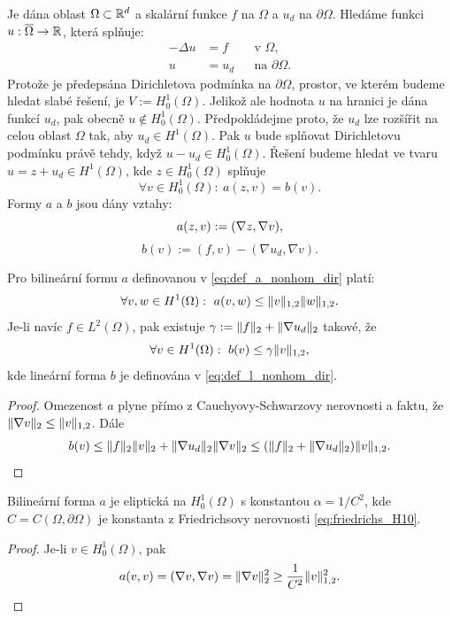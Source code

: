 Je dána oblast $\Omega\subset\mathbb R^d$ a skalární funkce $f$ na $\Omega$ a $u_d$ na $\partial\Omega$.
Hledáme funkci $u:\overline\Omega\rightarrow\mathbb R$, která splňuje:
\[ 
\begin{aligned}
    -\Delta u &= f &&\text{v }\Omega,\\
    u&=u_d && \text{na }\partial\Omega.
\end{aligned} 
\]
Protože je předepsána Dirichletova podmínka na $\partial\Omega$, prostor, ve kterém budeme hledat slabé řešení, je $V:=H^1_0(\Omega)$.
Jelikož ale hodnota $u$ na hranici je dána funkcí $u_d$, pak obecně $u\notin H^1_0(\Omega)$.
Předpokládejme proto, že $u_d$ lze rozšířit na celou oblast $\Omega$ tak, aby $u_d\in H^1(\Omega)$.
Pak $u$ bude splňovat Dirichletovu podmínku právě tehdy, když $u-u_d\in H^1_0(\Omega)$.
Řešení budeme hledat ve tvaru $u=z+u_d\in H^1(\Omega)$, kde $z\in H^1_0(\Omega)$ splňuje
\[ 
    \forall v\in H^1_0(\Omega):\ a(z,v)=b(v).
\]
Formy $a$ a $b$ jsou dány vztahy:
\begin{equation}\label{eq:def_a_nonhom_dir}
    a(z,v) := (\nabla z, \nabla v),
\end{equation}
\begin{equation}\label{eq:def_l_nonhom_dir}
    b(v) := (f,v) - (\nabla u_d,\nabla v).
\end{equation}
\begin{veta}
    Pro bilineární formu $a$ definovanou v \eqref{eq:def_a_nonhom_dir} platí:
    \[ \forall v,w\in H^1(\Omega):~a(v,w) \le \|v\|_{1,2}\|w\|_{1,2}. \]
    Je-li navíc $f\in L^2(\Omega)$, pak existuje $\gamma:=\|f\|_2+\|\nabla u_d\|_2$ takové, že
    \[ \forall v\in H^1(\Omega):~b(v) \le \gamma\|v\|_{1,2}, \]
    kde lineární forma $b$ je definována v \eqref{eq:def_l_nonhom_dir}.
\end{veta}
\begin{proof}
    Omezenost $a$ plyne přímo z Cauchyovy-Schwarzovy nerovnosti a faktu, že $\|\nabla v\|_2\le\|v\|_{1,2}$.
    Dále
    \[ b(v)\le \|f\|_2\|v\|_2 + \|\nabla u_d\|_2\|\nabla v\|_2
    \le (\|f\|_2+\|\nabla u_d\|_2)\|v\|_{1,2}. \]
\end{proof}


\begin{veta}
    Bilineární forma $a$ je eliptická na $H^1_0(\Omega)$ s konstantou $\alpha=1/C^2$, 
    kde $C=C(\Omega,\partial\Omega)$ je konstanta z Friedrichsovy nerovnosti \eqref{eq:friedrichs_H10}.
\end{veta}
\begin{proof}
    Je-li $v\in H^1_0(\Omega)$, pak
    \[ 
        a(v,v) = (\nabla v,\nabla v) 
               = \|\nabla v\|_2^2 \ge \frac1{C^2}\|v\|_{1,2}^2. 
    \]
\end{proof}

